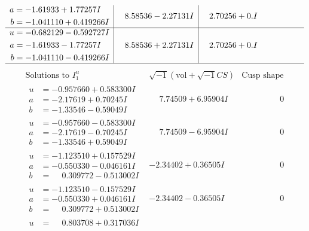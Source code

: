\documentclass[1p]{elsarticle_modified}
\theoremstyle{definition}
\newcommand{\I}{\sqrt{-1}}
\begin{document}
$$\begin{array}{c|c|c}
\begin{aligned}
a &= -1.61933 + 1.77257 I \\
b &= -1.041110 + 0.419266 I\end{aligned}
 & \phantom{-}8.58536 - 2.27131 I & \phantom{-}2.70256 + 0. I\phantom{ +0.000000I} \\ \hline\begin{aligned}
u &= -0.682129 - 0.592727 I \\
a &= -1.61933 - 1.77257 I \\
b &= -1.041110 - 0.419266 I\end{aligned}
 & \phantom{-}8.58536 + 2.27131 I & \phantom{-}2.70256 + 0. I\phantom{ +0.000000I}\\
 \hline 
 \end{array}$$\newpage$$\begin{array}{c|c|c}  
\text{Solutions to }I^u_{1}& \I (\text{vol} + \sqrt{-1}CS) & \text{Cusp shape}\\
 \hline 
\begin{aligned}
u &= -0.957660 + 0.583300 I \\
a &= -2.17619 + 0.70245 I \\
b &= -1.33546 - 0.59049 I\end{aligned}
 & \phantom{-}7.74509 + 6.95904 I & \phantom{-0.000000 } 0 \\ \hline\begin{aligned}
u &= -0.957660 - 0.583300 I \\
a &= -2.17619 - 0.70245 I \\
b &= -1.33546 + 0.59049 I\end{aligned}
 & \phantom{-}7.74509 - 6.95904 I & \phantom{-0.000000 } 0 \\ \hline\begin{aligned}
u &= -1.123510 + 0.157529 I \\
a &= -0.550330 - 0.046161 I \\
b &= \phantom{-}0.309772 - 0.513002 I\end{aligned}
 & -2.34402 + 0.36505 I & \phantom{-0.000000 } 0 \\ \hline\begin{aligned}
u &= -1.123510 - 0.157529 I \\
a &= -0.550330 + 0.046161 I \\
b &= \phantom{-}0.309772 + 0.513002 I\end{aligned}
 & -2.34402 - 0.36505 I & \phantom{-0.000000 } 0 \\ \hline\begin{aligned}
u &= \phantom{-}0.803708 + 0.317036 I \\

\end{aligned}
\end{array}$$
\end{document}
